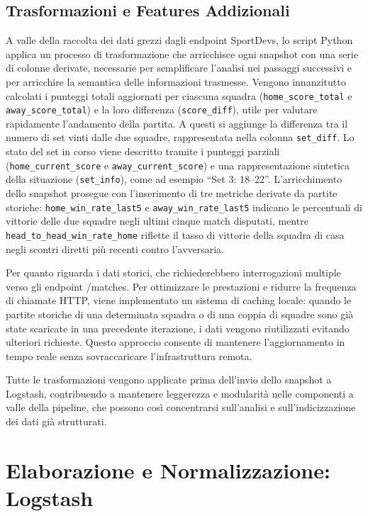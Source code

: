 \documentclass[a4paper,12pt]{report}
\begin{document}
\subsection{Trasformazioni e Features Addizionali}

A valle della raccolta dei dati grezzi dagli endpoint SportDevs, lo script Python applica un processo di trasformazione che arricchisce ogni snapshot con una serie di colonne derivate, necessarie per semplificare l’analisi nei passaggi successivi e per arricchire la semantica delle informazioni trasmesse.
Vengono innanzitutto calcolati i punteggi totali aggiornati per ciascuna squadra (\texttt{home\_score\_total} e \texttt{away\_score\_total}) e la loro differenza (\texttt{score\_diff}), utile per valutare rapidamente l’andamento della partita. A questi si aggiunge la differenza tra il numero di set vinti dalle due squadre, rappresentata nella colonna \texttt{set\_diff}. Lo stato del set in corso viene descritto tramite i punteggi parziali (\texttt{home\_current\_score} e \texttt{away\_current\_score}) e una rappresentazione sintetica della situazione (\texttt{set\_info}), come ad esempio ``Set 3: 18--22''.
L’arricchimento dello snapshot prosegue con l’inserimento di tre metriche derivate da partite storiche: \texttt{home\_win\_rate\_last5} e \texttt{away\_win\_rate\_last5} indicano le percentuali di vittorie delle due squadre negli ultimi cinque match disputati, mentre \texttt{head\_to\_head\_win\_rate\_home} riflette il tasso di vittorie della squadra di casa negli scontri diretti più recenti contro l’avversaria.

Per quanto riguarda i dati storici, che richiederebbero interrogazioni multiple verso gli endpoint /matches. Per ottimizzare le prestazioni e ridurre la frequenza di chiamate HTTP, viene implementato un sistema di caching locale: quando le partite storiche di una determinata squadra o di una coppia di squadre sono già state scaricate in una precedente iterazione, i dati vengono riutilizzati evitando ulteriori richieste. Questo approccio consente di mantenere l’aggiornamento in tempo reale senza sovraccaricare l’infrastruttura remota.

Tutte le trasformazioni vengono applicate prima dell’invio dello snapshot a Logstash, contribuendo a mantenere leggerezza e modularità nelle componenti a valle della pipeline, che possono così concentrarsi sull’analisi e sull’indicizzazione dei dati già strutturati.

\section{Elaborazione e Normalizzazione: Logstash}
\end{document}
